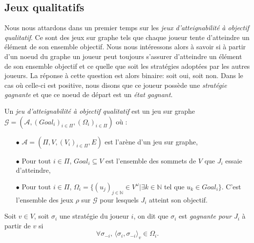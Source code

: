 

\subsection{Jeux qualitatifs}


Nous nous attardons dans un premier temps sur les \emph{jeux d'atteignabilité à objectif qualitatif}. Ce sont des jeux sur graphe tels que chaque joueur tente d'atteindre un élément de son ensemble objectif. Nous nous intéressons alors à savoir si à partir d'un noeud du graphe un joueur peut toujours s'assurer d'atteindre un élément de son ensemble objectif et ce quelle que soit les stratégies adoptées par les autres joueurs. La réponse à cette question est alors binaire: soit oui, soit non. Dans le cas où celle-ci est positive, nous disons que ce joueur possède une \emph{stratégie gagnante} et que ce noeud de départ est un \emph{état gagnant}.
	
	\begin{defi}
		Un \textit{jeu d'atteignabilité à objectif qualitatif} est un jeu sur graphe $\mathcal{G} = (\mathcal{A}, (Goal_{i})_{i \in \Pi},(\Omega _{i})_{i \in \Pi})$ où :
		\begin{enumerate}
			\item[$\bullet$] $\mathcal{A} = (\Pi,V,(V_{i})_{i \in \Pi}, E)$ est l'arène d'un jeu sur graphe,
			\item[$\bullet$] Pour tout $i \in \Pi$, $Goal_{i} \subseteq V $ est l'ensemble des sommets de $V$ que $J_{i}$ essaie d'atteindre,
			\item[$\bullet$] Pour tout $i \in \Pi$, $\Omega _{i} = \{(u_{j})_{j \in \mathbb{N}}\in V^{\omega}| \exists k \in \mathbb{N}$  tel que $u_{k}\in Goal_{i}\}$. C'est l'ensemble des jeux $\rho$ sur $\mathcal{G}$ pour lesquels $J_{i}$ atteint son objectif.
		\end{enumerate}	
	\end{defi}
	
	\label{strategieGagnante}
	\begin{defi}
		Soit $v \in V$, soit $\sigma _{i}$ une stratégie du joueur $i$, on dit que $\sigma _{i}$ est \textit{gagnante pour $J_{i}$} à partir de $v$ si 
		$$ \forall \sigma_{-i}, \, \langle \sigma_i, \sigma_{-i} \rangle_v \in \Omega_i.$$
	\end{defi}
	
